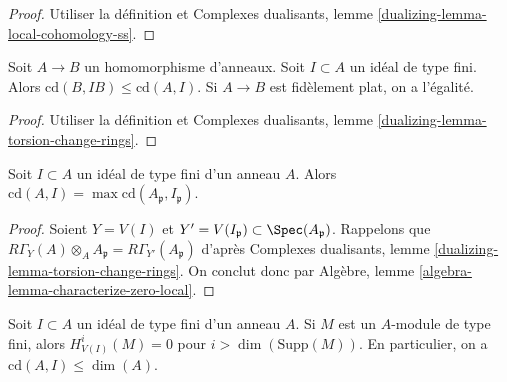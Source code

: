 \begin{proof}
Utiliser la définition et Complexes dualisants, lemme \ref{dualizing-lemma-local-cohomology-ss}.
\end{proof}

\begin{lemma}
\label{lemma-cd-change-rings}
Soit $A \to B$ un homomorphisme d'anneaux. Soit $I \subset A$ un idéal de type fini. Alors $\text{cd}(B, IB) \leq \text{cd}(A, I)$. Si $A \to B$ est fidèlement plat, on a l'égalité.
\end{lemma}

\begin{proof}
Utiliser la définition et Complexes dualisants, lemme \ref{dualizing-lemma-torsion-change-rings}.
\end{proof}

\begin{lemma}
\label{lemma-cd-local}
Soit $I \subset A$ un idéal de type fini d'un anneau $A$. Alors $\text{cd}(A, I) = \max \text{cd}(A_\mathfrak p, I_\mathfrak p)$.
\end{lemma}

\begin{proof}
Soient $Y = V(I)$ et $Y' = V(I_\mathfrak p) \subset \Spec(A_\mathfrak p)$. Rappelons que $R\Gamma_Y(A) \otimes_A A_\mathfrak p = R\Gamma_{Y'}(A_\mathfrak p)$ d'après Complexes dualisants, lemme \ref{dualizing-lemma-torsion-change-rings}. On conclut donc par Algèbre, lemme \ref{algebra-lemma-characterize-zero-local}.
\end{proof}

\begin{lemma}
\label{lemma-cd-dimension}
Soit $I \subset A$ un idéal de type fini d'un anneau $A$. Si $M$ est un $A$-module de type fini, alors $H^i_{V(I)}(M) = 0$ pour $i > \dim(\text{Supp}(M))$. En particulier, on a $\text{cd}(A, I) \leq \dim(A)$.
\end{lemma}

